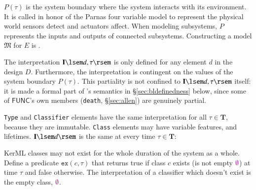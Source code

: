 \pn $P(\tau)$ is the system boundary where the system interacts with its environment.  It is called  in honor of the Parnas four variable model to represent the physical world sensors detect and actuators affect.  When modeling subsystems, $P$ represents the inputs and outputs of connected subsystems.  Constructing a model $\mathfrak{M}$ for $E$ is .

\pn The interpretation $\mathbf{I}\lsem d,\tau\rsem$ is only defined for any element $d$ in the design $D$.  Furthermore, the interpretation is contingent on the values of the system boundary $P(\tau)$.  This partiality is not confined to $\mathbf{I}\lsem d,\tau\rsem$ itself: it is made a formal part of \logicid's semantics in \S\ref{sec:bldefinedness} below, since some of $\mathsf{FUNC}$'s own members (\texttt{death}, \S\ref{sec:allen}) are genuinely partial.

\pn \texttt{Type} and \texttt{Classifier} elements have the same interpretation for all $\tau\in\mathbf{T}$, because they are immutable.  \texttt{Class} elements may have variable features, and lifetimes.  $\mathbf{I}\lsem d \rsem$ is the same at every time $\tau\in\mathbf{T}$:

\dfblmodels

\dfblmodelsc

\pn KerML classes may not exist for the whole duration of the system as a whole.  Define a predicate $\texttt{ex}(c,\tau)$ that returns true if class $c$ exists (is not empty $\emptyclass$) at time $\tau$ and false otherwise.  The interpretation of a classifier which doesn't exist is the empty class, $\emptyclass$.

